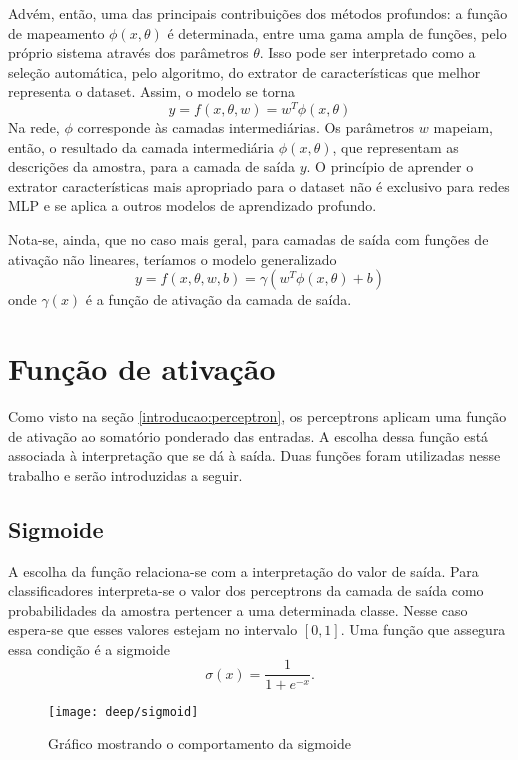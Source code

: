 Advém, então, uma das principais contribuições dos métodos profundos: a função de mapeamento $\phi(x,\theta)$ é determinada, entre uma gama ampla de funções, pelo próprio sistema através dos parâmetros $\theta$. Isso pode ser interpretado como a seleção automática, pelo algoritmo, do extrator de características que melhor representa o dataset. Assim, o modelo se torna 
\begin{equation}
y=f(x,\theta,w) = w^T\phi(x,\theta)
\end{equation}
Na rede, $\phi$ corresponde às camadas intermediárias. Os parâmetros $w$ mapeiam, então, o resultado da camada intermediária $\phi(x,\theta)$, que representam as descrições da amostra, para a camada de saída $y$. O princípio de aprender o extrator características mais apropriado para o dataset não é exclusivo para redes MLP e se aplica a outros modelos de aprendizado profundo.

Nota-se, ainda, que no caso mais geral, para camadas de saída com funções de ativação não lineares, teríamos o modelo generalizado
\begin{equation}
y=f(x,\theta,w,b) = \gamma(w^T\phi(x,\theta)+b)
\end{equation}
onde $\gamma(x)$ é a função de ativação da camada de saída.

\section{Função de ativação}
\label{sec:funcao-ativacao}
Como visto na seção \ref{introducao:perceptron}, os perceptrons aplicam uma função de ativação ao somatório ponderado das entradas. A escolha dessa função está associada à interpretação que se dá à saída. Duas funções foram utilizadas nesse trabalho e serão introduzidas a seguir.

\subsection{Sigmoide}
A escolha da função relaciona-se com a interpretação do valor de saída. Para classificadores interpreta-se o valor dos perceptrons da camada de saída como probabilidades da amostra pertencer a uma determinada classe. Nesse caso espera-se que esses valores estejam no intervalo $[0,1]$. Uma função que assegura essa condição é a sigmoide
\begin{equation}
	\label{eq:sigm}
	\sigma(x) = \frac{1}{1+e^{-x}}.
\end{equation}

\begin{figure}[h]
\centering
\texttt{[image: deep/sigmoid]}
\caption{Gráfico mostrando o comportamento da sigmoide}
\label{fig:sigmoid}
\end{figure}

